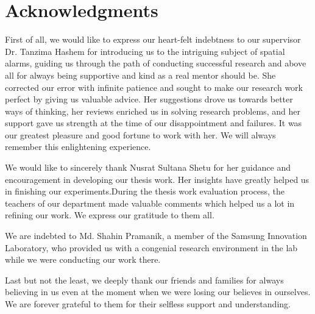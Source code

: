 \chapter*{Acknowledgments}

\hspace{3ex}
First of all, we would like to express our heart-felt indebtness to our supervisor Dr. \hspace{-0.8ex}Tanzima Hashem for introducing us to the intriguing subject of spatial alarms, guiding us through the path of conducting successful research and above all for always being supportive and kind as a real mentor should be. She corrected our error with infinite patience and sought to make our research work perfect by giving us valuable advice. Her suggestions drove us towards better ways of thinking, her reviews enriched us in solving research problems, and her support gave us strength at the time of our disappointment and failures. It was our greatest pleasure and good fortune to work with her. We will always remember this enlightening experience. 

We would like to sincerely thank Nusrat Sultana Shetu for her guidance and encouragement in developing our thesis work. Her insights have greatly helped us in finishing our experiments.During the thesis work evaluation process, the teachers of our department made valuable comments which helped us a lot in refining our work. We express our gratitude to them all.

We are indebted to Md. Shahin Pramanik, a member of the Samsung Innovation Laboratory, who provided us with a congenial research environment in the lab while we were conducting our work there.

Last but not the least, we deeply thank our friends and families for always believing in us even at the moment when we were losing our believes in ourselves. We are forever grateful to them for their selfless support and understanding.





